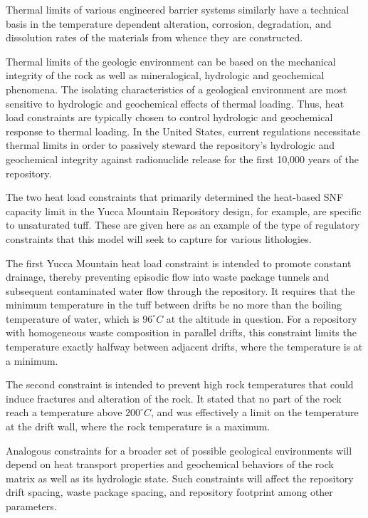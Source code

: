 \documentclass[letterpaper]{article}
\begin{document}
 Thermal limits of various engineered barrier systems similarly have a technical 
 basis in the temperature dependent alteration, corrosion, degradation, and 
 dissolution rates of the materials from whence they are constructed.  

 Thermal limits of the geologic environment can be based on the mechanical 
 integrity of the rock as well as mineralogical, hydrologic and geochemical 
 phenomena. The isolating characteristics of a geological environment are most 
 sensitive to hydrologic 
 and geochemical effects of thermal loading. Thus, heat load constraints are 
 typically chosen to control hydrologic and geochemical response to thermal 
 loading. In the United States, current regulations necessitate thermal limits 
 in 
 order to passively steward the repository's hydrologic and geochemical 
 integrity 
 against radionuclide  release for the first 10,000 years of the repository.

 The two heat load constraints that primarily determined the heat-based 
 \gls{SNF} 
 capacity limit in the Yucca Mountain Repository design, for example, are 
 specific to unsaturated tuff. These are given here as an example of the type of 
 regulatory constraints that this model will seek to capture for various 
 lithologies. 

 The first Yucca Mountain heat load constraint is intended to promote constant 
 drainage, thereby preventing episodic flow into waste package tunnels and
 subsequent contaminated water flow through the repository. It requires that the 
 minimum temperature in the tuff between drifts be no  more than the boiling 
 temperature of water, which is $96^{\circ}C$ at the altitude in question. For a 
 repository with homogeneous waste composition in parallel drifts, this 
 constraint 
 limits the temperature exactly halfway between adjacent drifts, where the 
 temperature is at a minimum.

 The second constraint is intended to prevent high rock temperatures that could 
 induce fractures and alteration of the rock. It stated that no part 
 of the rock reach a temperature above $200^{\circ}C$, and was effectively a 
 limit on the temperature at the drift wall, where the rock temperature is a 
 maximum.  

 Analogous constraints for a broader set of possible geological environments 
 will 
 depend on heat transport properties and geochemical behaviors of the rock 
 matrix 
 as well as its hydrologic state.  Such constraints will affect the  
 repository drift spacing, waste package spacing, and repository footprint among 
 other parameters. 
\end{document}
